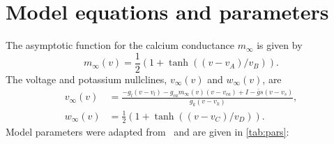 \documentclass[utf8]{frontiers_suppmat} %
\begin{document}
\onecolumn
{}

\title[Supplementary Material]{{}}


\maketitle

\section{Model equations and parameters}
The asymptotic function for the calcium conductance $m_{\infty}$ is given by
\begin{equation}
	m_{\infty}(v) = \frac{1}{2}\left(1+\tanh{\left((v-v_{A})/v_{B}\right)}\right).
\end{equation}
The voltage and potassium nullclines, \(v_{\infty}(v)\) and \(w_{\infty}(v)\), are
\begin{align}
	v_{\infty}(v) & = \frac{-g_{l}(v-v_{l}) - g_{ca}m_{\infty}(v)(v-v_{ca}) + I - \bar g s(v-v_{s})}{g_{k}(v-v_{k})},
	\\
	w_{\infty}(v) & = \frac{1}{2}\left(1+\tanh{\left((v-v_{C})/v_{D}\right)}\right).
\end{align}
Model parameters were adapted from~\cite{bose2011} and are given in \cref{tab:pars}:
\end{document}
